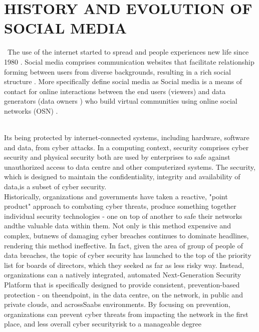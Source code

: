 
\chapter{HISTORY AND EVOLUTION OF SOCIAL MEDIA}\
\hspace*{0.3in}The use of the internet started to spread and people
experiences new life since 1980 . Social media comprises
communication websites that facilitate relationship forming
between users from diverse backgrounds, resulting in a rich
social structure . More specifically  define social media
as Social media is a means of contact for online interactions
between the end users (viewers) and data generators (data
owners ) who build virtual communities using online social
networks (OSN) .

\\
\hspace*{0.3in}Its being protected by internet-connected systems, including hardware, software and data, from cyber attacks. In a computing context, security comprises cyber security and physical security both are used by enterprises to safe against unauthorized access to data centre and other computerized systems. The security, which is designed to maintain the confidentiality, integrity and availability of data,is a subset of cyber security. \\

\hspace*{0.3in}Historically, organizations and governments have taken a reactive, "point product" approach to combating cyber threats, produce something together individual security technologies - one on top of another to safe their networks andthe valuable data within them. Not only is this method expensive and complex, butnews of damaging cyber breaches continues to dominate headlines, rendering this method ineffective. In fact, given the area of group of people of data breaches, the topic of cyber security has launched to the top of the priority list for boards of directors, which they seeked as far as less risky way. Instead, organizations can a natively integrated, automated Next-Generation Security Platform that is specifically designed to provide consistent, prevention-based protection - on theendpoint, in the data centre, on the network, in public and private clouds, and acrossSaabs environments. By focusing on prevention, organizations can prevent cyber threats from impacting the network in the first place, and less overall cyber securityrisk to a manageable degree \\


